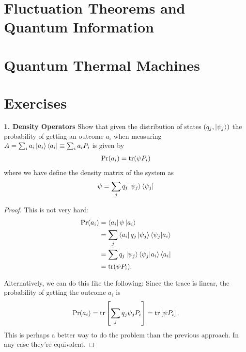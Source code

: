 \documentclass{book}
\theoremstyle{definition}
\newcommand{\nn}{\nonumber}
\newcommand{\lb}{\left[}
\newcommand{\rb}{\right]}
\begin{document}
\newpage
\section{Fluctuation Theorems and Quantum Information}


\newpage
\section{Quantum Thermal Machines}




\newpage


\section{Exercises}

\noindent \textbf{1. Density Operators} Show that given the distribution of states $(q_j, \ket{\psi_j})$ the probability of getting an outcome $a_i$ when measuring $A = \sum_i a_i \ket{a_i}\bra{a_i} \equiv \sum_i a_i P_i$ is given by
\begin{align}
\Pr(a_i) = \tr(\psi P_i)
\end{align} 
where we have define the density matrix of the system as
\begin{align}
\psi = \sum_j q_j \ket{\psi_j}\bra{\psi_j}
\end{align}


\begin{proof}
	This is not very hard: 
	\begin{align}
	\Pr(a_i) &= \bra{a_i} \psi \ket{a_i}\nn\\
	&= \sum_j \bra{a_i} q_j \ket{\psi_j}\bra{\psi_j}\ket{a_i}\nn\\
	&= \sum q_j \ket{\psi_j}\bra{\psi_j}\ket{a_i}\bra{a_i}\nn\\
	&= \tr(\psi P_i).
	\end{align}


Alternatively, we can do this like the following: Since the trace is linear, the probability of getting the outcome $a_i$ is 
\begin{align}
\Pr(a_i) = \tr\lb \sum_j q_j \psi_j P_i \rb = \tr\lb \psi P_i \rb.
\end{align}
This is perhaps a better way to do the problem than the previous approach. In any case they're equivalent. 
\end{proof}
\end{document}
